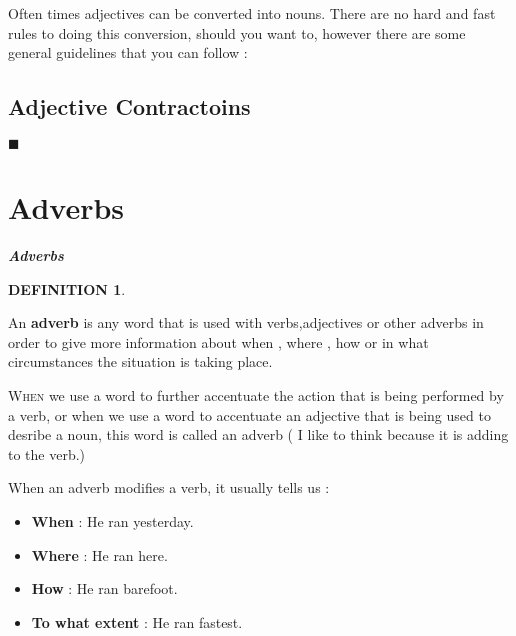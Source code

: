 \documentclass[a4paper,twocolumn,10pt]{article}
\newtheorem{mydef}{DEFINITION}[section]
\newcommand{\newpar}
{\par \vspace{0.3cm}}
\newcommand{\sectionend}
{
\nolinenumbers
\begin{center}
	$\blacksquare$
\end{center}
\clearpage
\linenumbers
}
\newcommand{\subsectionend}
{
\nolinenumbers
\linenumbers
}
\newcommand{\tcolorboxstart}
{
	\nolinenumbers
	\vspace{0.2cm}
	\centering
}
\newcommand{\tcolorboxend}
{
	\justifying
	\vspace{0.2cm}
	\linenumbers
}
\newcommand{\tcolorboxdefinition}[3]
{

\tcolorboxstart
\begin{defn-bg}

	\begin{defn-title}[width=7cm]{}
	{
		\normalsize \textbf{\textit{#1}}
	}
	\end{defn-title}

	\begin{defn-theword}
	{
		\footnotesize
		\begin{mydef} #2
		\end{mydef}
	}
	\end{defn-theword}


	\begin{defn-content}

	\justify
	#3

	\end{defn-content}

\end{defn-bg}
\tcolorboxend
}
\begin{document}
Often times adjectives can be converted into nouns. There are no hard and fast
rules to doing this conversion, should you want to, however there are some
general guidelines that you can follow :\newpar

\subsectionend

\subsection{Adjective Contractoins}
\label{ssec:adjective_contractoins}


\subsectionend

\sectionend

\section{{Adverbs}}
\label{sec:adverbs}



\tcolorboxdefinition
{Adverbs}
{\label{def:adverbs}}
{

An \textbf{adverb }is any word that is used with verbs,adjectives or other
adverbs in order to give more information about when , where , how or in what
circumstances the situation is taking place.\cite{collins_german_grammar}

}


\lettrine[lines=3, findent=3pt, nindent=0pt]{W}{hen} we use a word to further
accentuate the action that is being performed by a verb, or when we use a word
to accentuate an adjective that is being used to desribe a noun, this word is
called an adverb ( I like to think because it is adding to the verb.)\newpar

When an adverb modifies a verb, it usually tells us :

\begin{itemize}[noitemsep]
	\item \textbf {When} : He ran yesterday.
	\item \textbf {Where} : He ran here.
	\item \textbf{How }: He ran barefoot.
	\item \textbf{To what extent }: He ran fastest.
\end{itemize}
\end{document}
